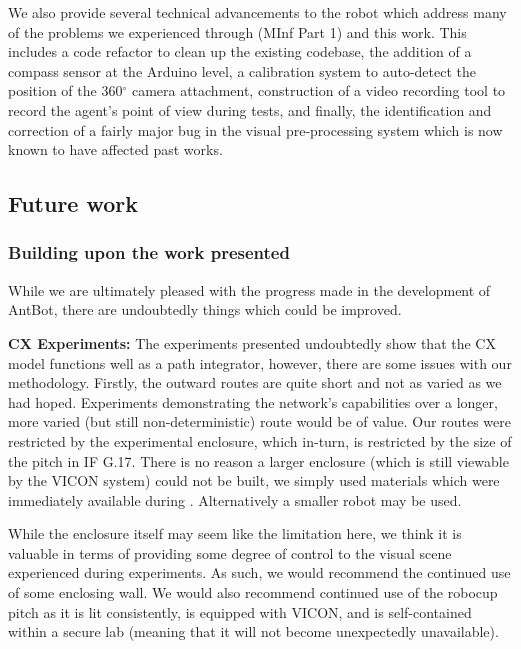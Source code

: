 \documentclass[a4paper,11pt,twoside,openright]{article}
\begin{document}
We also provide several technical advancements to the robot which
address many of the problems we experienced through
\cite{Mitchell2018} (MInf Part 1) and this work. This includes a code refactor to
clean up the existing codebase, the addition of a compass sensor at
the Arduino level, a calibration system to auto-detect the position of
the 360$^\circ$ camera attachment, construction of a video recording
tool to record the agent's point of view during tests, and finally,
the identification and correction of a fairly major bug in the visual
pre-processing system which is now known to have affected past works.

\subsection{Future work}
\subsubsection{Building upon the work presented}
While we are ultimately pleased with the progress made in the
development of AntBot, there are undoubtedly things which could be
improved.\newline\par

\textbf{CX Experiments:} The experiments presented undoubtedly show
that the CX model functions well as a path integrator, however, there
are some issues with our methodology. Firstly, the outward routes are
quite short and not as varied as we had hoped. Experiments
demonstrating the network's capabilities over a longer, more varied
(but still non-deterministic) route would be of value. Our routes were
restricted by the experimental enclosure, which in-turn, is restricted
by the size of the pitch in IF G.17. There is no reason a larger
enclosure (which is still viewable by the VICON system) could not be
built, we simply used materials which were immediately available
during \cite{Mitchell2018}. Alternatively a smaller robot may be used.
\newline\par

While the enclosure itself may seem like the limitation here, we think
it is valuable in terms of providing some degree of control to the
visual scene experienced during experiments. As such, we would
recommend the continued use of some enclosing wall. We would also
recommend continued use of the robocup pitch as it is lit
consistently, is equipped with VICON, and is self-contained within a
secure lab (meaning that it will not become unexpectedly unavailable).
\newline\par
\end{document}
